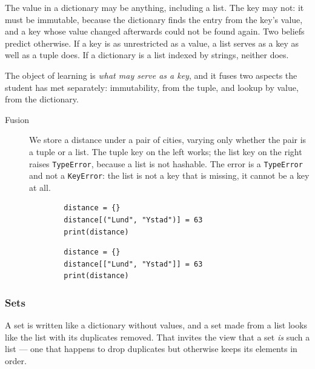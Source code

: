 The value in a dictionary may be anything, including a list. The key may not:
it must be immutable, because the dictionary finds the entry from the key's
value, and a key whose value changed afterwards could not be found again. Two
beliefs predict otherwise. If a key is as unrestricted as a value, a list
serves as a key as well as a tuple does. If a dictionary is a list indexed by
strings, neither does.

The object of learning is \emph{what may serve as a key}, and it fuses two
aspects the student has met separately: immutability, from the tuple, and
lookup by value, from the dictionary.

\begin{description}
  \item[Fusion] We store a distance under a pair of cities, varying only
    whether the pair is a tuple or a list. The tuple key on the left works; the
    list key on the right raises \texttt{TypeError}, because a list
    is not hashable. The error is a \texttt{TypeError} and not a
    \texttt{KeyError}: the list is not a key that is missing, it
    cannot be a key at all.

    \hfill
    \begin{minipage}[t]{0.45\columnwidth}
      \begin{verbatim}
        distance = {}
        distance[("Lund", "Ystad")] = 63
        print(distance)
      \end{verbatim}
    \end{minipage}
    \hfill
    \begin{minipage}[t]{0.45\columnwidth}
      \begin{verbatim}
        distance = {}
        distance[["Lund", "Ystad"]] = 63
        print(distance)
      \end{verbatim}
    \end{minipage}
\end{description}

\subsubsection{Sets}

A set is written like a dictionary without values, and a set made from a list
looks like the list with its duplicates removed. That invites the view that a
set \emph{is} such a list --- one that happens to drop duplicates but otherwise
keeps its elements in order.

